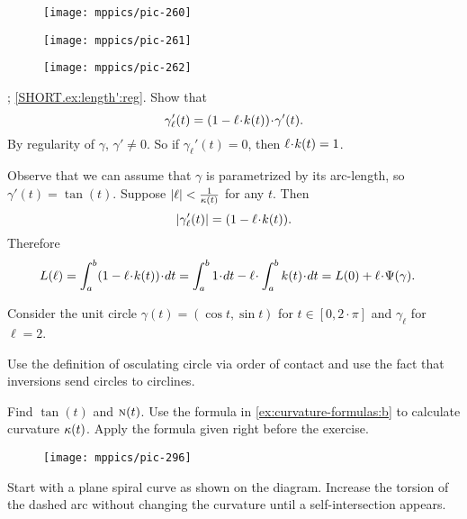\begin{figure}[h!]
\begin{minipage}{.32\textwidth}
\centering
\texttt{[image: mppics/pic-260]}
\end{minipage}\hfill
\begin{minipage}{.32\textwidth}
\centering
\texttt{[image: mppics/pic-261]}
\end{minipage}
\hfill
\begin{minipage}{.32\textwidth}
\centering
\texttt{[image: mppics/pic-262]}
\end{minipage}
\end{figure}

\parbf{\ref{ex:length'}}; \ref{SHORT.ex:length':reg}.
Show that
\[
\gamma_\ell'(t)=(1-\ell\cdot\skur(t))\cdot \gamma'(t).
\]
By regularity of $\gamma$, $\gamma'\ne0$.
So if $\gamma_\ell'(t)=0$, then $\ell\cdot \skur(t)= 1$.

 Observe that we can assume that $\gamma$ is parametrized by its arc-length, so $\gamma'(t)=\tan(t)$.
Suppose $|\ell|<\frac{1}{\kappa(t)}$ for any $t$.
Then 
\[
|\gamma_\ell'(t)|=(1-\ell\cdot\skur(t)).
\]
Therefore
\begin{align*}
L(\ell)
&=
\int_a^b(1-\ell\cdot\skur(t))\cdot dt=
\int_a^b 1\cdot dt-\ell\cdot \int_a^b\skur(t)\cdot dt=
L(0)+\ell\cdot\Psi(\gamma).
\end{align*}



Consider the unit circle $\gamma(t)=(\cos t,\sin t)$ for $t\in[0,2\cdot\pi]$ and $\gamma_\ell$ for $\ell=2$.

Use the definition of osculating circle via order of contact and use the fact that inversions send circles to circlines. 

Find $\tan(t)$ and $\text{\sc{n}}(t)$.
Use the formula in \ref{ex:curvature-formulas:b} to calculate curvature $\kappa(t)$.
Apply the formula given right before the exercise.

\begin{wrapfigure}{r}{15 mm}
\vskip-0mm
\centering
\texttt{[image: mppics/pic-296]}
\vskip0mm
\end{wrapfigure}

 Start with a plane spiral curve as shown on the diagram.
Increase the torsion of the dashed arc without changing the curvature until a self-intersection appears.


